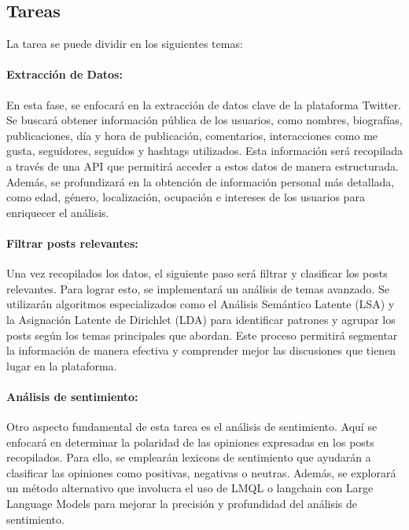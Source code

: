 \documentclass[
  letterpaper,
  DIV=11,
  numbers=noendperiod]{scrartcl}
\let\oldparagraph\paragraph
\renewcommand{\paragraph}[1]{\oldparagraph{#1}\mbox{}}
\begin{document}
\subsection{Tareas}\label{tareas}

La tarea se puede dividir en los siguientes temas:

\paragraph{Extracción de Datos:}\label{extracciuxf3n-de-datos}

En esta fase, se enfocará en la extracción de datos clave de la
plataforma Twitter. Se buscará obtener información pública de los
usuarios, como nombres, biografías, publicaciones, día y hora de
publicación, comentarios, interacciones como me gusta, seguidores,
seguidos y hashtags utilizados. Esta información será recopilada a
través de una API que permitirá acceder a estos datos de manera
estructurada. Además, se profundizará en la obtención de información
personal más detallada, como edad, género, localización, ocupación e
intereses de los usuarios para enriquecer el análisis.

\paragraph{Filtrar posts relevantes:}\label{filtrar-posts-relevantes}

Una vez recopilados los datos, el siguiente paso será filtrar y
clasificar los posts relevantes. Para lograr esto, se implementará un
análisis de temas avanzado. Se utilizarán algoritmos especializados como
el Análisis Semántico Latente (LSA) y la Asignación Latente de Dirichlet
(LDA) para identificar patrones y agrupar los posts según los temas
principales que abordan. Este proceso permitirá segmentar la información
de manera efectiva y comprender mejor las discusiones que tienen lugar
en la plataforma.

\paragraph{Análisis de sentimiento:}\label{anuxe1lisis-de-sentimiento}

Otro aspecto fundamental de esta tarea es el análisis de sentimiento.
Aquí se enfocará en determinar la polaridad de las opiniones expresadas
en los posts recopilados. Para ello, se emplearán lexicons de
sentimiento que ayudarán a clasificar las opiniones como positivas,
negativas o neutras. Además, se explorará un método alternativo que
involucra el uso de LMQL o langchain con Large Language Models para
mejorar la precisión y profundidad del análisis de sentimiento.
\end{document}
